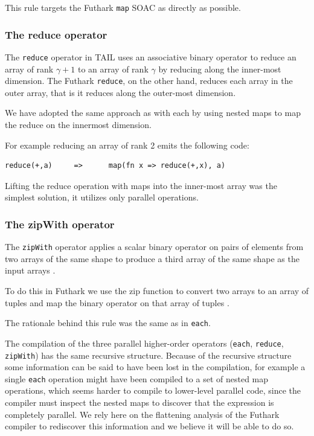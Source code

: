 \documentclass[11pt]{article}
\begin{document}
This rule targets the Futhark {\tt map} SOAC as directly as possible. 

\subsubsection{The reduce operator}

The {\tt reduce} operator in TAIL uses an associative binary operator to reduce an array of rank
$\gamma+1$ to an array of rank $\gamma$ by reducing along the inner-most dimension\cite{ElsmanDybdal:Array:2014}.
The Futhark {\tt reduce}, on the other hand, reduces each array in the outer array, that is it reduces along the outer-most dimension\cite{TroelsHenriksen}.
 
We have adopted the same approach as with each by using nested maps to map the reduce on the innermost dimension.
 
For example reducing an array of rank 2 emits the following code:
 
\begin{lstlisting}[numbers=none,frame=none]
reduce(+,a)     =>      map(fn x => reduce(+,x), a)
\end{lstlisting}

Lifting the reduce operation with maps into the inner-most array was the simplest solution, it utilizes only parallel operations.

\subsubsection{The zipWith operator}
The {\tt zipWith} operator applies a scalar binary operator on pairs of elements from two arrays of the same shape to
produce a third array of the same shape as the input arrays \cite{ElsmanDybdal:Array:2014}.
 
To do this in Futhark we use the zip function to convert two arrays to an array of tuples and map the binary operator on that array of tuples \cite{TroelsHenriksen}.

The rationale behind this rule was the same as in {\tt each}.

The compilation of the three parallel higher-order operators ({\tt each}, {\tt reduce}, {\tt zipWith}) has the same recursive structure.
Because of the recursive structure some information can be said to have been lost
in the compilation, for example a single {\tt each} operation might have been compiled to a set of nested map operations,
which seems harder to compile to lower-level parallel code, since the compiler must inspect the nested maps to discover that the expression is completely parallel.
We rely here on the flattening analysis of the Futhark compiler to rediscover this information and we believe it will be able to do so.
\end{document}
